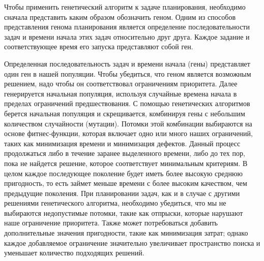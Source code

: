 Чтобы применить генетический алгоритм к задаче планирования, необходимо сначала представить каким образом обозначить геном. Одним из способов представления генома планирования является определение последовательности задач и времени начала этих задач относительно друг друга. Каждое задание и соответствующее время его запуска представляют собой ген.

Определенная последовательность задач и времени начала (гены) представляет один ген в нашей популяции. Чтобы убедиться, что геном является возможным решением, надо чтобы он соответствовал ограничениям приоритета. Далее генерируется начальная популяция, используя случайные времена начала в пределах ограничений предшествования. С помощью генетических алгоритмов берется начальная популяция и скрещивается, комбинируя гены с небольшим количеством случайности (мутации). Потомки этой комбинации выбираются на основе фитнес-функции, которая включает одно или много наших ограничений, таких как минимизация времени и минимизация дефектов. Данный процесс продолжаться либо в течение заранее выделенного времени, либо до тех пор, пока не найдется решение, которое соответствует минимальным критериям. В целом каждое последующее поколение будет иметь более высокую среднюю пригодность, то есть займет меньше времени с более высоким качеством, чем предыдущие поколения. При планировании задач, как и в случае с другими решениями генетического алгоритма, необходимо убедиться, что мы не выбираются недопустимые потомки, такие как отпрыски, которые нарушают наше ограничение приоритета. Также может потребоваться добавить дополнительные значения пригодности, такие как минимизация затрат; однако каждое добавляемое ограничение значительно увеличивает пространство поиска и уменьшает количество подходящих решений.
